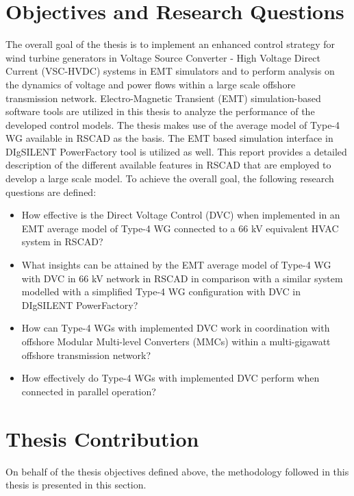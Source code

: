 \section{Objectives and Research Questions}
The overall goal of the thesis is to implement an enhanced control strategy for wind turbine generators in Voltage Source Converter - High Voltage Direct Current (\gls{VSC}-\gls{HVDC}) systems in \gls{EMT} simulators and to perform analysis on the dynamics of voltage and power flows within a large scale offshore transmission network. Electro-Magnetic Transient (\gls{EMT}) simulation-based software tools are utilized in this thesis to analyze the performance of the developed control models. The thesis makes use of the average model of Type-4 \gls{WG} available in RSCAD as the basis. The \gls{EMT} based simulation interface in DIgSILENT PowerFactory tool is utilized as well. This report provides a detailed description of the different available features in RSCAD that are employed to develop a large scale model. 
To achieve the overall goal, the following research questions are defined:
\begin{itemize}
    \item How effective is the Direct Voltage Control (\gls{DVC}) when implemented in an \gls{EMT} average model of Type-4 \gls{WG} connected to a 66 kV equivalent \gls{HVAC} system in RSCAD?
    
    \item What insights can be attained by the \gls{EMT} average model of Type-4 \gls{WG} with \gls{DVC} in 66 kV network in RSCAD in comparison with a similar system modelled with a simplified Type-4 \gls{WG} configuration with \gls{DVC} in DIgSILENT PowerFactory?
    
    \item How can Type-4 \gls{WG}s with implemented \gls{DVC} work in coordination with offshore Modular Multi-level Converters (\gls{MMC}s) within a multi-gigawatt offshore transmission network?
    
    \item How effectively do Type-4 \gls{WG}s with implemented \gls{DVC} perform when connected in parallel operation?

\end{itemize}

\section{Thesis Contribution}
On behalf of the thesis objectives defined above, the methodology followed in this thesis is presented in this section.

